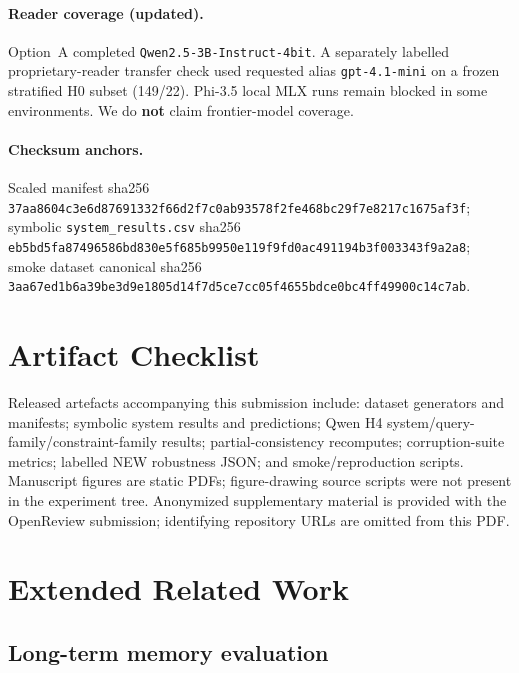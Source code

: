 \paragraph{Reader coverage (updated).}
Option~A completed \texttt{Qwen2.5-3B-Instruct-4bit}. A separately labelled proprietary-reader transfer check used requested alias \texttt{gpt-4.1-mini} on a frozen stratified H0 subset (149/22). Phi-3.5 local MLX runs remain blocked in some environments. We do \textbf{not} claim frontier-model coverage.

\paragraph{Checksum anchors.} Scaled manifest sha256 \texttt{37aa8604c3e6d87691332f66d2f7c0ab93578f2fe468bc29f7e8217c1675af3f}; symbolic \texttt{system\_results.csv} sha256 \texttt{eb5bd5fa87496586bd830e5f685b9950e119f9fd0ac491194b3f003343f9a2a8}; smoke dataset canonical sha256 \texttt{3aa67ed1b6a39be3d9e1805d14f7d5ce7cc05f4655bdce0bc4ff49900c14c7ab}.

\section{Artifact Checklist}
\label{app:artifacts}

Released artefacts accompanying this submission include: dataset generators and manifests; symbolic system results and predictions; Qwen H4 system/query-family/constraint-family results; partial-consistency recomputes; corruption-suite metrics; labelled NEW robustness JSON; and smoke/reproduction scripts. Manuscript figures are static PDFs; figure-drawing source scripts were not present in the experiment tree. Anonymized supplementary material is provided with the OpenReview submission; identifying repository URLs are omitted from this PDF.

\section{Extended Related Work}
\label{app:related}
\label{app:closest}

\subsection{Long-term memory evaluation}

